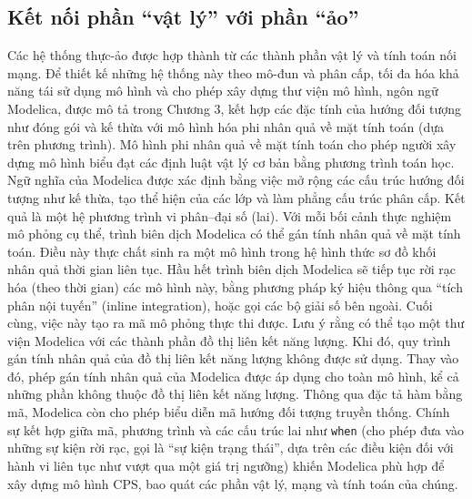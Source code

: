 \subsection{Kết nối phần ``vật lý'' với phần ``ảo''}
Các hệ thống thực-ảo được hợp thành từ các thành phần vật lý và tính toán nối mạng. Để thiết kế những hệ thống này theo mô-đun và phân cấp, tối đa hóa khả năng tái sử dụng mô hình và cho phép xây dựng thư viện mô hình, ngôn ngữ Modelica, được mô tả trong Chương 3, kết hợp các đặc tính của hướng đối tượng như đóng gói và kế thừa với mô hình hóa phi nhân quả về mặt tính toán (dựa trên phương trình). Mô hình phi nhân quả về mặt tính toán cho phép người xây dựng mô hình biểu đạt các định luật vật lý cơ bản bằng phương trình toán học. Ngữ nghĩa của Modelica được xác định bằng việc mở rộng các cấu trúc hướng đối tượng như kế thừa, tạo thể hiện của các lớp và làm phẳng cấu trúc phân cấp. Kết quả là một hệ phương trình vi phân--đại số (lai). Với mỗi bối cảnh thực nghiệm mô phỏng cụ thể, trình biên dịch Modelica có thể gán tính nhân quả về mặt tính toán. Điều này thực chất sinh ra một mô hình trong hệ hình thức sơ đồ khối nhân quả thời gian liên tục. Hầu hết trình biên dịch Modelica sẽ tiếp tục rời rạc hóa (theo thời gian) các mô hình này, bằng phương pháp ký hiệu thông qua ``tích phân nội tuyến'' (inline integration), hoặc gọi các bộ giải số bên ngoài. Cuối cùng, việc này tạo ra mã mô phỏng thực thi được. Lưu ý rằng có thể tạo một thư viện Modelica với các thành phần đồ thị liên kết năng lượng. Khi đó, quy trình gán tính nhân quả của đồ thị liên kết năng lượng không được sử dụng. Thay vào đó, phép gán tính nhân quả của Modelica được áp dụng cho toàn mô hình, kể cả những phần không thuộc đồ thị liên kết năng lượng. Thông qua đặc tả hàm bằng mã, Modelica còn cho phép biểu diễn mã hướng đối tượng truyền thống. Chính sự kết hợp giữa mã, phương trình và các cấu trúc lai như \texttt{when} (cho phép đưa vào những sự kiện rời rạc, gọi là ``sự kiện trạng thái'', dựa trên các điều kiện đối với hành vi liên tục như vượt qua một giá trị ngưỡng) khiến Modelica phù hợp để xây dựng mô hình CPS, bao quát các phần vật lý, mạng và tính toán của chúng.

